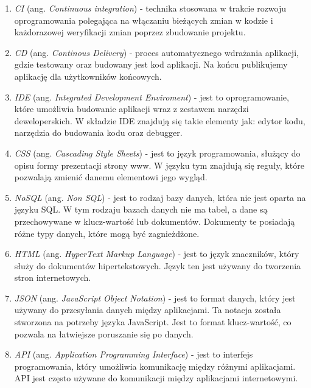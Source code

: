 \begin{enumerate}
    \item \label{CI} \textit{CI} (ang. \textit{Continuous integration}) - technika stosowana w trakcie rozwoju oprogramowania polegająca na włączaniu bieżących zmian w kodzie i każdorazowej weryfikacji zmian poprzez zbudowanie projektu.
    \item \label{CD} \textit{CD} (ang. \textit{Continous Delivery}) - proces automatycznego wdrażania aplikacji, gdzie testowany oraz budowany jest kod aplikacji. Na końcu publikujemy aplikację dla użytkowników końcowych.
    \item \label{IDE} \textit{IDE} (ang. \textit{Integrated Development Enviroment}) - jest to oprogramowanie, które umożliwia budowanie aplikacji wraz z zestawem narzędzi deweloperskich. W składzie IDE znajdują się takie elementy jak: edytor kodu, narzędzia do budowania kodu oraz debugger.
    \item \label{CSS} \textit{CSS} (ang. \textit{Cascading Style Sheets}) - jest to język programowania, służący do opisu formy prezentacji strony www. W języku tym znajdują się reguły, które pozwalają zmienić danemu elementowi jego wygląd.
    \item \label{NoSQL} \textit{NoSQL} (ang. \textit{Non SQL}) - jest to rodzaj bazy danych, która nie jest oparta na języku SQL. W tym rodzaju bazach danych nie ma tabel, a dane są przechowywane w klucz-wartość lub dokumentów. Dokumenty te posiadają różne typy danych, które mogą być zagnieżdżone.
    \item \label{HTML} \textit{HTML} (ang. \textit{HyperText Markup Language}) - jest to język znaczników, który służy do dokumentów hipertekstowych. Język ten jest używany do tworzenia stron internetowych.
    \item \label{JSON} \textit{JSON} (ang. \textit{JavaScript Object Notation}) - jest to format danych, który jest używany do przesyłania danych między aplikacjami. Ta notacja została stworzona na potrzeby języka JavaScript. Jest to format klucz-wartość, co pozwala na łatwiejsze poruszanie się po danych.
    \item \label{API} \textit{API} (ang. \textit{Application Programming Interface}) - jest to interfejs programowania, który umożliwia komunikację między różnymi aplikacjami. API jest często używane do komunikacji między aplikacjami internetowymi.
\end{enumerate}
